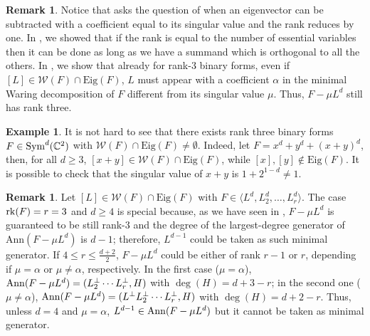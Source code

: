 \documentclass{amsart}
\numberwithin{theorem}{section}
\theoremstyle{definition}
\newtheorem{remark}[theorem]{Remark}
\newtheorem{example}[theorem]{Example}
\newcommand{\Eig}{\mathrm{Eig}}
\newcommand{\W}{\mathcal{W}}
\newcommand{\CC}{\mathbb{C}}
\newcommand{\rk}{\mathop{\rm rk}\nolimits}
\newcommand{\sym}{\mathop{\rm Sym}\nolimits}
\begin{document}
\begin{remark}
    Notice that \cite{HT25} asks the question of when an eigenvector can be subtracted with a coefficient equal to its singular value and the rank reduces by one. In , we showed that if the rank is equal to the number of essential variables then it can be done as long as we have a summand which is orthogonal to all the others. In , we show that already for rank-$3$ binary forms, even if $[L]\in\mathcal W(F)\cap \mathrm{Eig}(F)$, $L$ must appear with a coefficient $\alpha$ in the minimal Waring decomposition of $F$ different from its singular value $\mu$.
    Thus, $F-\mu L^d$ still has rank three.
\end{remark}

\begin{example}
    It is not hard to see that there exists rank three binary forms $F\in\sym^d(\CC^2)$ with $\mathcal W(F)\cap\mathrm{Eig}(F)\neq \emptyset$. Indeed, let $F=x^d+y^d+(x+y)^d$, then, for all $d\geq3$, $[x+y]\in \mathcal W(F)\cap\Eig(F)$, while $[x],[y]\not\in\mathrm{Eig}(F)$. It is possible to check that the singular value of $x+y$ is $1+2^{1-d} \neq 1$.
\end{example}

\begin{remark}\label{rmk: ann}
    Let $[L] \in \W(F) \cap \Eig(F)$ with $F \in \langle L^d,L_2^d,\ldots,L_r^d \rangle$. The case $\rk(F) =r=3$ and $d \geq4$ is special because, as we have seen in  , $F-\mu L^d$ is guaranteed to be still rank-$3$ and the degree of the largest-degree generator of $\mathrm{Ann}(F-\mu L^d)$ is $d-1$; therefore, $L^{d-1}$ could be taken as such minimal generator. If $4 \leq r \leq \frac{d+2}{2}$, $F - \mu L^d$ could be either of rank $r-1$ or $r$, depending if $\mu = \alpha$ or $\mu \neq \alpha$, respectively. In the first case ($\mu = \alpha$), ${\rm Ann}(F-\mu L^d) = (L_2^\perp\cdots L_r^\perp, H)$ with $\deg(H) = d+3-r$; in the second one ($\mu \neq \alpha$), ${\rm Ann}(F-\mu L^d) = (L^\perp L_2^\perp\cdots L_r^\perp, H)$ with $\deg(H) = d+2-r$. Thus, unless $d = 4$ and $\mu = \alpha$, $L^{d-1} \in {\rm Ann}(F-\mu L^d)$ but it cannot be taken as minimal generator.
 \end{remark}
\end{document}
